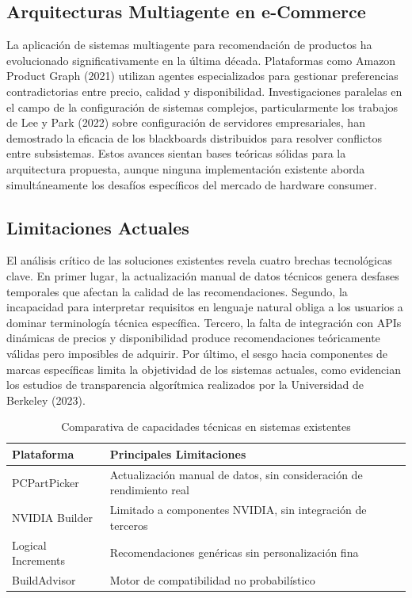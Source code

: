 \documentclass{llncs}
\begin{document}
\subsection{Arquitecturas Multiagente en e-Commerce}
La aplicación de sistemas multiagente para recomendación de productos ha evolucionado significativamente en la última década. Plataformas como Amazon Product Graph (2021) utilizan agentes especializados para gestionar preferencias contradictorias entre precio, calidad y disponibilidad. Investigaciones paralelas en el campo de la configuración de sistemas complejos, particularmente los trabajos de Lee y Park (2022) sobre configuración de servidores empresariales, han demostrado la eficacia de los blackboards distribuidos para resolver conflictos entre subsistemas. Estos avances sientan bases teóricas sólidas para la arquitectura propuesta, aunque ninguna implementación existente aborda simultáneamente los desafíos específicos del mercado de hardware consumer.

\subsection{Limitaciones Actuales}
El análisis crítico de las soluciones existentes revela cuatro brechas tecnológicas clave. En primer lugar, la actualización manual de datos técnicos genera desfases temporales que afectan la calidad de las recomendaciones. Segundo, la incapacidad para interpretar requisitos en lenguaje natural obliga a los usuarios a dominar terminología técnica específica. Tercero, la falta de integración con APIs dinámicas de precios y disponibilidad produce recomendaciones teóricamente válidas pero imposibles de adquirir. Por último, el sesgo hacia componentes de marcas específicas limita la objetividad de los sistemas actuales, como evidencian los estudios de transparencia algorítmica realizados por la Universidad de Berkeley (2023).

\begin{table}[h]
	\centering
	\caption{Comparativa de capacidades técnicas en sistemas existentes}
	\label{tab:comparativa}
	\begin{tabular}{p{3cm}p{8cm}}
		\toprule
		\textbf{Plataforma} & \textbf{Principales Limitaciones} \\
		\midrule
		PCPartPicker & Actualización manual de datos, sin consideración de rendimiento real \\
		NVIDIA Builder & Limitado a componentes NVIDIA, sin integración de terceros \\
		Logical Increments & Recomendaciones genéricas sin personalización fina \\
		BuildAdvisor & Motor de compatibilidad no probabilístico \\
		\bottomrule
	\end{tabular}
\end{table}
	
\end{document}
